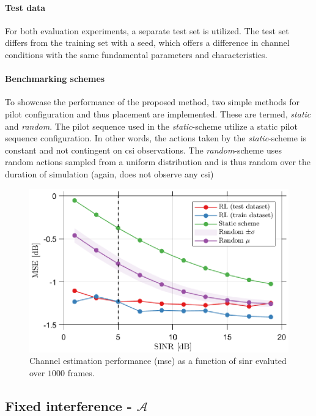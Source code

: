 \paragraph{Test data}
For both evaluation experiments, a separate test set is utilized. The test set differs from the training set with a seed, which offers a difference in channel conditions with the same fundamental parameters and characteristics.

\paragraph{Benchmarking schemes}
To showcase the performance of the proposed method, two simple methods for pilot configuration and thus placement are implemented. These are termed, \emph{static} and \emph{random}. The pilot sequence used in the \emph{static}-scheme utilize a static pilot sequence configuration. In other words, the actions taken by the \emph{static}-scheme is constant and not contingent on \gls{csi} observations. The \emph{random}-scheme uses random actions sampled from a uniform distribution and is thus random over the duration of simulation (again, does not observe any \gls{csi}) 
 \begin{figure}
    \centering
    \includegraphics{chapters/part_uplink/figures/results/SINR_sweep.eps}
    \caption{Channel estimation performance (\gls{mse}) as a function of \gls{sinr} evaluted over $1000$ frames.}
    \label{fig:RL_sinr_sweep}
\end{figure}

\subsection{Fixed interference -  $\mathcal{A}$}\label{subsec:RL_results_A}

